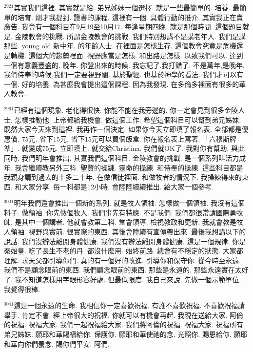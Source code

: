 \documentclass{book}
\begin{document}
$^{2921}$其實我們這裡.
其實就是給.
弟兄姊妹一個選擇.
就是一些最簡單的.
培養.
最簡單的培育.
剛才我提到.
證書的課程.
這裡有一個.
具體行動的推介.
其實我正在賣廣告.
我會有一個科目在9月19至10月17.
每逢星期四晚.
就是那個時間.
這個題目就是.
金陵教會的挑戰.
所謂金陵教會的挑戰.
我們特別想講不是講老年人.
我們是講那些.
young old 新中年.
的年齡人士.
在裡面是怎樣生存.
這個教會究竟是危機還是轉機.
這個大的趨勢裡面.
視野應當是怎樣.
和出路是怎樣.
以致我們可以.
達到一個有意義豐盛的.
晚年.
你登出來的時候.
我忘記了,我打錯了.
不是萬年,是晚年.
我們侍奉的時候,我們一定要視野闊.
基於聖經.
也基於神學的看法.
我們才可以有一個.
好的培養.
為甚麼我會提出這個課程.
因為我發現.
在多倫多裡面有很多的華人教會.

$^{2961}$已經有這個現象.
老化得很快.
你能不能在我旁邊的.
你一定會見到很多金陵人士.
怎樣推動他.
上帝都給我機會.
做這個工作.
希望這個科目可以幫到弟兄姊妹.
既然大家今天來到這裡.
我再作一個決定.
如果你今天立即填了報名表.
全部都是優惠價.
75元.
省下15元.
省下15元可以買個飯盒.
你在報名表上寫著.
「六穆斯牌準」.
就變成75元.
立即填上.
就交給Christina.
我們就OK了.
我對你有幫助.
與此同時.
我們明年會推出.
其實我們這個科目.
金陵教會的挑戰.
是一個系列叫活力成年.
我會繼續教另外三科.
聖賢的操練.
靈命的操練.
和侍奉的操練.
這些科目都是.
我親身講到過去的十多二十年.
在做信徒裡面.
和做牧者的情況下.
我操練得來的東西.
和大家分享.
每一科都是12小時.
會陸陸續續推出.
給大家一個參考.

$^{3001}$明年我們還會推出一個新的系列.
就是牧人領袖.
怎樣做一個領袖.
我沒有這個料子.
做領袖.
你先做個牧人.
我們事先有特應.
不是我們.
我們都很常請國際勇牧師.
是其中一個講者.
他就會教第二科.
堂會領導.
檢視教政和更新.
我就會教是牧人領袖.
視野與實前.
很實際的東西.
其後會陸續有宣傳帶出來.
最後我想講以下的說話.
我們沒辦法離開身體健康.
我們沒有辦法離開身體健康.
這是一個規律.
你是秦始皇.
吃了長生不老的丹.
都沒什麼用.
始終前路.
總會有不穩定的狀態.
大家都理解.
求天父都引導你們.
真的有一個好的改進.
引導你和保守你.
從今時至永遠.
我們不是顧念眼前的東西.
我們顧念眼前的東西.
那些是永遠的.
那些永遠實在太好了.
我不知道怎樣用字眼形容好處.
但最低限度.
我自己來說.
先做一個示範單位.
我覺得很棒.

$^{3041}$這是一個永遠的生命.
我相信你一定喜歡祝福.
有誰不喜歡祝福.
不喜歡祝福請舉手.
肯定不會.
經上帝很大的祝福.
你就可以有機會再起.
我現在送給大家.
阿倫的祝福.
祝福大家.
我們一起祝福給大家.
我們將阿倫的祝福.
祝福大家.
祝福所有弟兄姊妹.
願耶和華賜福給你.
保護你.
願耶和華使祂的念.
光照你.
賜恩給你.
願耶和華向你們養念.
賜你們平安.
阿們.
\newpage
\end{document}
